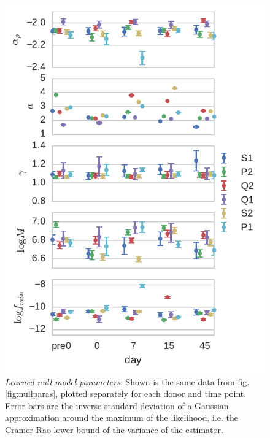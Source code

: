 \documentclass[letterpaper,english,prl,reprint,longbibliography]{revtex4-1} %
\begin{document}
\begin{figure}[ht!]
\includegraphics{fig3_learnednullparas}
\centering{}
\caption{
\emph{Learned null model parameters}. Shown is the same data from fig. \ref{fig:nullparas}, plotted separately for each donor and time point. Error bars are the inverse standard deviation of a Gaussian approximation around the maximum of the likelihood, i.e. the Cramer-Rao lower bound of the variance of the estimator. 
\label{fig:nullparas_timeseries}}
\end{figure}

  
\end{document}
